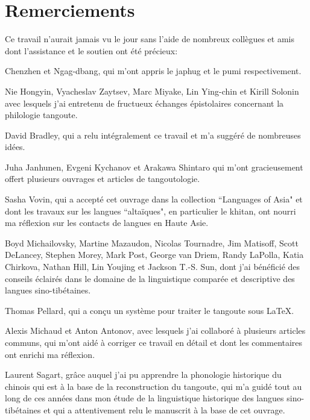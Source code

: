 \documentclass[oldfontcommands,twoside,a4paper,11pt,draft]{memoir}
\begin{document}
\setcounter{page}{5}
\thispagestyle{empty}
 \tableofcontents
\chapter*{Remerciements}
\thispagestyle{empty}
Ce travail n'aurait jamais vu le jour sans l'aide de nombreux collègues et amis dont l'assistance et le soutien ont été précieux: 

 Chenzhen et Ngag-dbang, qui m'ont appris le japhug et le pumi respectivement.
 
  Nie Hongyin, Vyacheslav Zaytsev, Marc Miyake, Lin Ying-chin et Kirill Solonin avec lesquels j'ai entretenu de fructueux échanges épistolaires concernant la philologie tangoute.

  David Bradley, qui a relu intégralement ce travail et m'a suggéré de nombreuses idées.

  Juha Janhunen, Evgeni Kychanov et Arakawa Shintaro  qui m'ont gracieusement offert plusieurs ouvrages et articles de tangoutologie.
  
   Sasha Vovin, qui a accepté cet ouvrage dans la collection ``Languages of Asia" et dont les travaux sur les langues ``altaïques", en particulier le khitan, ont nourri ma réflexion sur les contacts de langues en Haute Asie.
 
  Boyd Michailovsky, Martine Mazaudon, Nicolas Tournadre,  Jim Matisoff, Scott DeLancey, Stephen Morey, Mark Post, George van Driem, Randy LaPolla, Katia Chirkova, Nathan Hill, Lin Youjing et Jackson T.-S. Sun, dont j'ai bénéficié des conseils éclairés dans le domaine de la linguistique comparée et descriptive des langues sino-tibétaines.
 
   Thomas Pellard, qui  a conçu un système pour traiter le tangoute sous \LaTeX{}.
 
  Alexis Michaud et Anton Antonov, avec lesquels j'ai collaboré à plusieurs articles communs, qui  m'ont aidé à corriger   ce travail en détail et dont les commentaires ont enrichi ma réflexion.

   Laurent Sagart, grâce auquel j'ai pu apprendre la phonologie historique du chinois qui est à la base de la reconstruction du tangoute,  qui m'a guidé tout au long de ces années dans mon étude de la linguistique historique des langues sino-tibétaines et qui a attentivement relu le manuscrit à la base de cet ouvrage.
\end{document}
